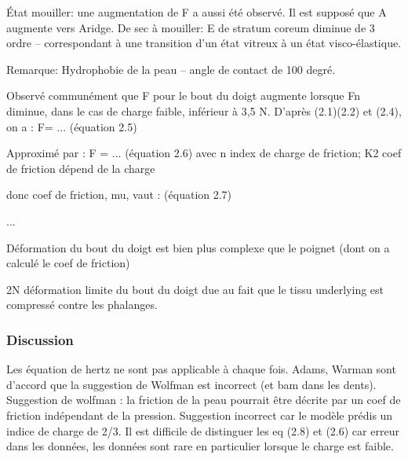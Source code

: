  État mouiller: une augmentation de F  a aussi été observé. Il est supposé que A augmente vers Aridge. 
 De sec à mouiller: E de stratum coreum diminue de 3 ordre -- correspondant à une transition d'un état vitreux à un état visco-élastique. 
 
Remarque: Hydrophobie de la peau -- angle de contact de 100 degré.

Observé communément que F pour le bout du doigt augmente lorsque Fn diminue, dans le cas de charge faible, inférieur à 3,5 N. D'après (2.1)(2.2) et (2.4), on a : 
F= ... (équation 2.5)

Approximé par :
F = ... (équation 2.6)
avec n index de charge de friction; K2 coef de friction dépend de la charge

donc coef de friction, mu, vaut :
(équation 2.7)

...


Déformation du bout du doigt est bien plus complexe que le poignet (dont on a calculé le coef de friction)
 
2N déformation limite du bout du doigt due au fait que le tissu underlying est compressé contre les phalanges.

\subsubsection{Discussion}

Les équation de hertz ne sont pas applicable à chaque fois. Adams, Warman sont d'accord que la suggestion de Wolfman est incorrect (et bam dans les dents). Suggestion de wolfman : la friction de la peau pourrait être décrite par un coef de friction indépendant de la pression. Suggestion incorrect car le modèle prédis un indice de charge de 2/3.
Il est difficile de distinguer les eq (2.8) et (2.6) car erreur dans les données, les données sont rare en particulier lorsque le charge est faible. 

